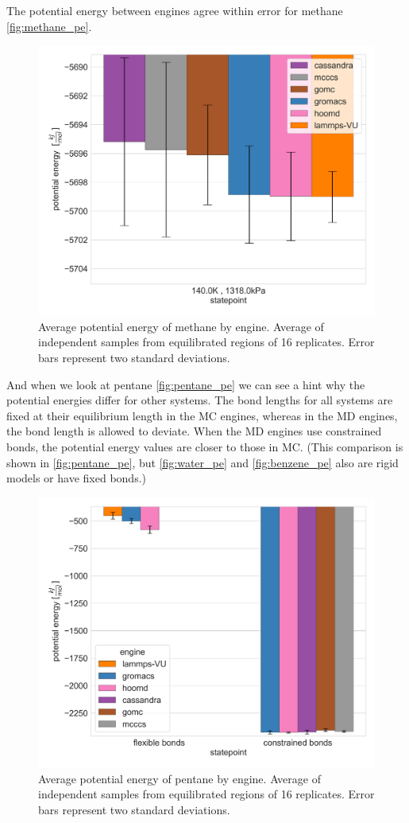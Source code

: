 The potential energy between engines agree within error for methane \autoref{fig:methane_pe}.
\begin{figure}[h!]
    \centering
    \includegraphics[width=0.8\linewidth,keepaspectratio]{figures/rep_study/methaneUA_pe_summary.png}
    \caption{Average potential energy of methane by engine. Average of independent samples from equilibrated regions of 16 replicates. Error bars represent two standard deviations.}\label{fig:methane_pe}
\end{figure}
And when we look at pentane \autoref{fig:pentane_pe} we can see a hint why the potential energies differ for other systems. 
The bond lengths for all systems are fixed at their equilibrium length in the MC engines, whereas in the MD engines, the bond length is allowed to deviate. 
When the MD engines use constrained bonds, the potential energy values are closer to those in MC. (This comparison is shown in \autoref{fig:pentane_pe}, but  \autoref{fig:water_pe} and \autoref{fig:benzene_pe} also are rigid models or have fixed bonds.)
\begin{figure}[h!]
    \centering
    \includegraphics[width=0.8\linewidth,keepaspectratio]{figures/rep_study/pentane_pe_summary.png}
    \caption{Average potential energy of pentane by engine. Average of independent samples from equilibrated regions of 16 replicates. Error bars represent two standard deviations.}\label{fig:pentane_pe}
\end{figure}


